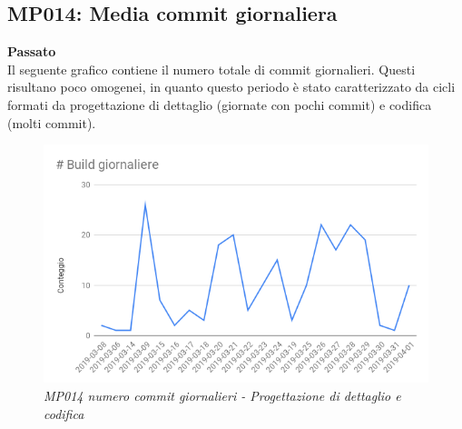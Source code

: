 \subsection{MP014: Media commit giornaliera}
\textbf{Passato}\\
Il seguente grafico contiene il numero totale di commit giornalieri. Questi risultano poco omogenei, in quanto questo periodo è stato caratterizzato da cicli formati da progettazione di dettaglio (giornate con pochi commit) e codifica (molti commit).\\
\begin{figure} [H]
    \centering
	\includegraphics[scale=0.4]{./images/buildsPDC.png}
    \caption{\textit{MP014 numero commit giornalieri - Progettazione di dettaglio e codifica}}
\end{figure}

